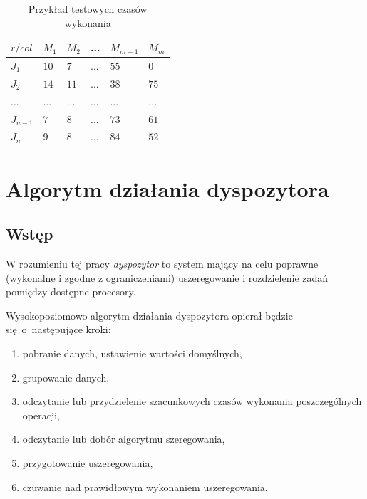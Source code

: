 \documentclass[brudnopis]{xmgr}
\begin{document}
\begin{table}[!tbh]
\begin{tabular}{|l|l|l|l|l|l|} \hline
$r / col$   & $M_1$     & $M_2$     & ...   & $M_{m-1}$ & $M_{m}$   \\ \hline
$J_1$       & $10$      & $7$       & ...   & $55$      & $0$       \\ \hline
$J_2$       & $14$      & $11$      & ...   & $38$      & $75$      \\ \hline
$...$       & $...$     & $...$     & $...$ & $...$     & $...$     \\ \hline
$J_{n-1}$   & $7$       & $8$       & ...   & $73$      & $61$      \\ \hline
$J_{n}$     & $9$       & $8$       & ...   & $84$      & $52$      \\ \hline
\end{tabular}
\caption{Przykład testowych czasów wykonania\label{tab:example-test_times}}
\end{table}


\chapter{Algorytm działania dyspozytora}


\section{Wstęp}

W rozumieniu tej pracy \emph{dyspozytor} to system mający na celu poprawne (wykonalne i zgodne z ograniczeniami) uszeregowanie i rozdzielenie zadań pomiędzy dostępne procesory.
\medskip

Wysokopoziomowo algorytm działania dyspozytora opierał będzie się~o~następujące kroki:
\begin{enumerate}
    \item pobranie danych, ustawienie wartości domyślnych,
    \item grupowanie danych,
    \item odczytanie lub przydzielenie szacunkowych czasów wykonania poszczególnych operacji,
    \item odczytanie lub dobór algorytmu szeregowania,
    \item przygotowanie uszeregowania,
    \item czuwanie nad prawidłowym wykonaniem uszeregowania.
\end{enumerate}
\end{document}
